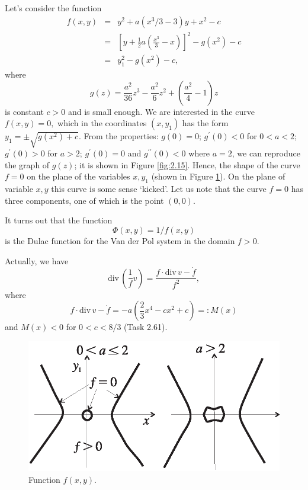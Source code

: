 \begin{example}
	Let's consider the function
	$$
	\begin{array}{lll}
	f(x,y) &=&y^{2}+a(x^{3}/3-3)y+x^{2}-c \\
	&=&\left[ y+\frac{1}{2}a\left( \frac{x^{3}}{3}-x\right) \right]
	^{2}-g(x^{2})-c \\
	&=&y_{1}^{2}-g(x^{2})-c,
	\end{array}
	$$
	where
	$$
	g(z)=\frac{a^{2}}{36}z^{3}-\frac{a^{2}}{6}z^{2}+\left( \frac{a^{2}}{4}%
	-1\right) z
	$$
	 is constant $c> 0$ and is small enough. We are interested in the curve $f(x,y)=0, $ which in the coordinates $\left( x,y_{1}\right) $ has the form $y_{1}=\pm \sqrt{g(x^{2})+c}$.  From the properties: $g(0)=0$; $g^{\prime }(0)<0 $ for $0<a<2$; $g^{\prime }(0)>0$ for $a>2$; $g^{\prime
	 }(0)=0$ and $g^{\prime \prime }(0)<0$ where $a = 2$, we can reproduce the graph of $g (z)$; it is shown in Figure \ref{fig:2.15}. Hence, the shape of the curve $ f = 0 $ on the plane of the variables $ x, y_ {1} $ (shown in Figure \ref{fig:2.16}). On the plane of variable $ x, y $ this curve is some sense `kicked'. Let us note that the curve $f = 0$ has three components, one of which is the point $(0, 0)$.
 
	 It turns out that the function
	 $$
	 \Phi (x,y)=1/f(x,y)
	 $$
	 is the Dulac function for the Van der Pol system in the domain $f> 0$.
	 
	 Actually, we have
	 $$
	 \textrm{div}\,\left( \frac{1}{f}v\right) =\frac{f\cdot \textrm{div}\,v-\dot{f
	 }}{f^{2}},
	 $$
	 where
	 $$
	 f\cdot \textrm{div}\,v-\dot{f}=-a\left( \frac{2}{3}x^{4}-cx^{2}+c\right)
	 =:M(x)
	 $$
	 and $M(x)<0$ for $0<c<8/3$ (Task 2.61).
	 
	 \begin{figure}[!ht]
	 	\centering
	 	\includegraphics [scale=1]{jtr216}
	 	\caption{Function $f(x,y)$.}
	 	\label{fig:2.16}
	 \end{figure}
 

\end{example}
